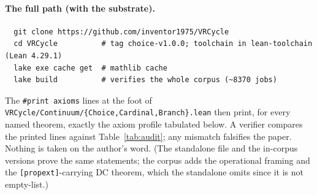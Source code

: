 \documentclass[11pt]{article}
\theoremstyle{remark}
\begin{document}
\paragraph{The full path (with the substrate).}
\begin{verbatim}
  git clone https://github.com/inventor1975/VRCycle
  cd VRCycle          # tag choice-v1.0.0; toolchain in lean-toolchain (Lean 4.29.1)
  lake exe cache get  # mathlib cache
  lake build          # verifies the whole corpus (~8370 jobs)
\end{verbatim}
The \texttt{\#print axioms} lines at the foot of
\texttt{VRCycle/Continuum/\{Choice,Cardinal,Branch\}.lean} then print,
for every named theorem, exactly the axiom profile tabulated below.  A
verifier compares the printed lines against Table~\ref{tab:audit}; any
mismatch falsifies the paper.  Nothing is taken on the author's word.
(The standalone file and the in-corpus versions prove the same
statements; the corpus adds the operational framing and the
\texttt{[propext]}-carrying DC theorem, which the standalone omits since
it is not empty-list.)
\end{document}
